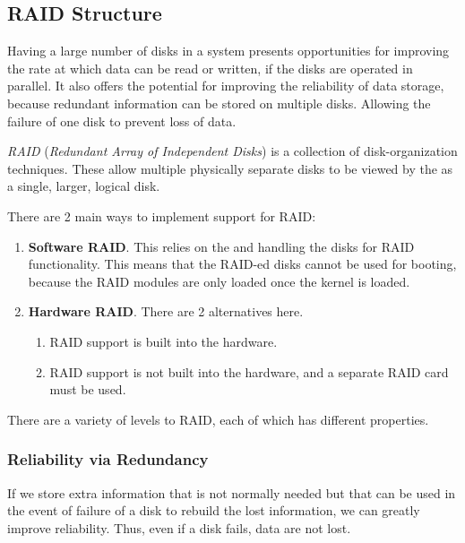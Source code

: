 \subsection{RAID Structure}\label{subsec:RAID_Structure}
Having a large number of disks in a system presents opportunities for improving the rate at which data can be read or written, if the disks are operated in parallel.
It also offers the potential for improving the reliability of data storage, because redundant information can be stored on multiple disks.
Allowing the failure of one disk to prevent loss of data.

\begin{definition}[RAID]\label{def:RAID}
  \emph{RAID} (\emph{Redundant Array of Independent Disks}) is a collection of disk-organization techniques.
  These allow multiple physically separate disks to be viewed by the  as a single, larger, logical disk.

  There are 2 main ways to implement support for RAID:\@
  \begin{enumerate}[noitemsep]
  \item \textbf{Software RAID}.
    This relies on the  and  handling the disks for RAID functionality.
    This means that the RAID-ed disks cannot be used for booting, because the RAID modules are only loaded once the kernel is loaded.

  \item \textbf{Hardware RAID}.
    There are 2 alternatives here.
    \begin{enumerate}[noitemsep]
    \item RAID support is built into the hardware.
    \item RAID support is not built into the hardware, and a separate RAID card must be used.
    \end{enumerate}
  \end{enumerate}

  There are a variety of levels to RAID, each of which has different properties.
\end{definition}

\subsubsection{Reliability via Redundancy}\label{subsubsec:RAID_Reliability_Redundancy}
If we store extra information that is not normally needed but that can be used in the event of failure of a disk to rebuild the lost information, we can greatly improve reliability.
Thus, even if a disk fails, data are not lost.

